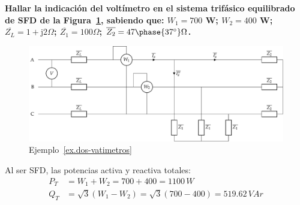 \documentclass[11pt]{book} %
\begin{document}
\begin{example}\label{ex.dos-vatimetros}
\textbf{Hallar la indicación del voltímetro en el sistema trifásico equilibrado de SFD de la Figura~\ref{fig.ej_dosvat}, sabiendo que: $W_1=700$ W; $W_2=400$ W; $\overline{Z_L}=1+\mathrm{j}2\Omega$; $\overline{Z_1}=100\Omega$; $\overline{Z_2}=47\phase{37^\circ}\Omega$.}
\begin{figure}[H]
    \centering
    \includegraphics[width=\linewidth]{../figs/ej_dosvat.pdf}
    \caption{Ejemplo~\ref{ex.dos-vatimetros}}
    \label{fig.ej_dosvat}
\end{figure}

Al ser SFD, las potencias activa y reactiva totales:
\begin{align*}
    P_T&=W_1+W_2=700+400=1100\,W\\
    Q_T&=\sqrt{3}(W_1-W_2)=\sqrt{3}(700-400)=519.62\,VAr
\end{align*}


\end{example}
\end{document}
